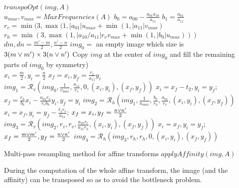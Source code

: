    \begin{algorithme}
    $transpoOpt(img,A)$\;\ \\
    $u_{max}, v_{max} = MaxFrequencies(A)$\;
	$b_0 = a_{00}-\frac{a_{01}a_{10}}{a_{11}}$\;
	$b_1 = \frac{a_{01}}{a_{11}}$\;
	$r_v = \min(3,\max (1,|a_{01}|u_{max}+\min (1,|a_{11}|v_{max})$\;
	$r_h = \min(3,\max (1,|a_{10}/a_{11}|r_vv_{max}+\min (1,|b_0|u_{max})))$\;
	\ \\
	$dm,dn = \frac{m'-m}{2},\frac{n'-n}{2}$\;
	$img_0 = $ an empty image which size is $3(m \vee m') \times 3(n \vee n')$\;
	Copy $img$ at the center of $img_0$ and fill the remaining parts of $img_0$ by symmetry)\;
	\ \\
	$x_i = \frac{m}{2}, y_i = \frac{n}{2}$\;
	$x_f = x_i, y_f = \frac{r_v}{a_{11}}y_i$\;
	$img_1 = \mathcal{R}_v(img_0,\frac{1}{v_{max}},\frac{a_{11}}{r_v},0,(x_i,y_i),(x_f,y_f))$\;
	$x_i = x_f-t_2, y_i = y_f$;
	$x_f = \frac{r_h}{b_0} x_i - \frac{a_{01}r_h}{r_v b_0} y_i, y_f = y_i$\;
	$img_2 = \mathcal{R}_h(img_1,\frac{1}{u_{max}},\frac{b_0}{r_h},\frac{a_{01}}{r_v},(x_i,y_i),(x_f,y_f))$\;
	$x_i = x_f, y_i = y_f - \frac{t_1r_v}{a_{11}}$;
	$x_f = x_i, y_f = \frac{n \vee n'}{2}$\;
	$img_3 = \mathcal{R}_v(img_2,r_v,r_v,\frac{a_{10}r_v}{a_{11}r_h},(x_i,y_i),(x_f,y_f))$\;
	$x_i = x_f, y_i = y_f$;
	$x_f = \frac{m \vee m'}{2}, y_f = \frac{n \vee n'}{2}$\;
	$img_4 = \mathcal{R}_h(img_3,r_h,r_h,0,(x_i,y_i),(x_f,y_f))$\;
    \caption{Multi-pass resampling method for affine transforms $applyAffinity(img,A)$}
    \label{algoPresqueAussiUniqueQueLesDeuxAutres}
   \end{algorithme}
   
 During the computation of the whole affine transform, the image (and the affinity) can be transposed so as to avoid the bottleneck problem.
  
